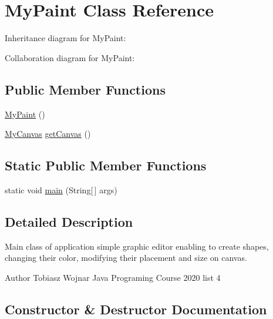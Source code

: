 \hypertarget{classMyPaint}{}\section{My\+Paint Class Reference}
\label{classMyPaint}


Inheritance diagram for My\+Paint\+:


Collaboration diagram for My\+Paint\+:
\subsection*{Public Member Functions}
\begin{DoxyCompactItemize}
\item 
\hyperlink{classMyPaint_a31b9ffa419854d0cbed918f868fba0a7}{My\+Paint} ()
\item 
\hyperlink{classMyCanvas}{My\+Canvas} \hyperlink{classMyPaint_a25a170deecb5b97feee8dcf377cb79f3}{get\+Canvas} ()
\end{DoxyCompactItemize}
\subsection*{Static Public Member Functions}
\begin{DoxyCompactItemize}
\item 
static void \hyperlink{classMyPaint_a4f39e825a285bcf19879a1f60a5f4c10}{main} (String\mbox{[}$\,$\mbox{]} args)
\end{DoxyCompactItemize}


\subsection{Detailed Description}
Main class of application simple graphic editor enabling to create shapes, changing their color, modifying their placement and size on canvas.

\begin{DoxyAuthor}{Author}
Tobiasz Wojnar Java Programing Course 2020 list 4 
\end{DoxyAuthor}


\subsection{Constructor \& Destructor Documentation}
\mbox{\label{classMyPaint_a31b9ffa419854d0cbed918f868fba0a7}} 
